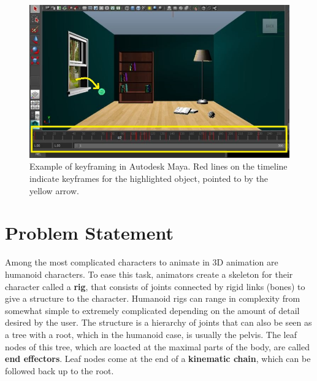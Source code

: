 \begin{figure}[h!]
\centering
\includegraphics[scale=0.5]{img/keyframing}
\caption{Example of keyframing in Autodesk Maya. Red lines on the timeline indicate keyframes for the highlighted object, pointed to by the yellow arrow.}
\label{fig:keyframes}
\end{figure}

\section{Problem Statement}

Among the most complicated characters to animate in 3D animation are humanoid characters. To ease this task, animators create a skeleton for their character called a \textbf{rig}, that consists of joints connected by rigid links (bones) to give a structure to the character. Humanoid rigs can range in complexity from somewhat simple to extremely complicated depending on the amount of detail desired by the user. The structure is a hierarchy of joints that can also be seen as a tree with a root, which in the humanoid case, is usually the pelvis. The leaf nodes of this tree, which are loacted at the maximal parts of the body, are called \textbf{end effectors}. Leaf nodes come at the end of a \textbf{kinematic chain}, which can be followed back up to the root.


